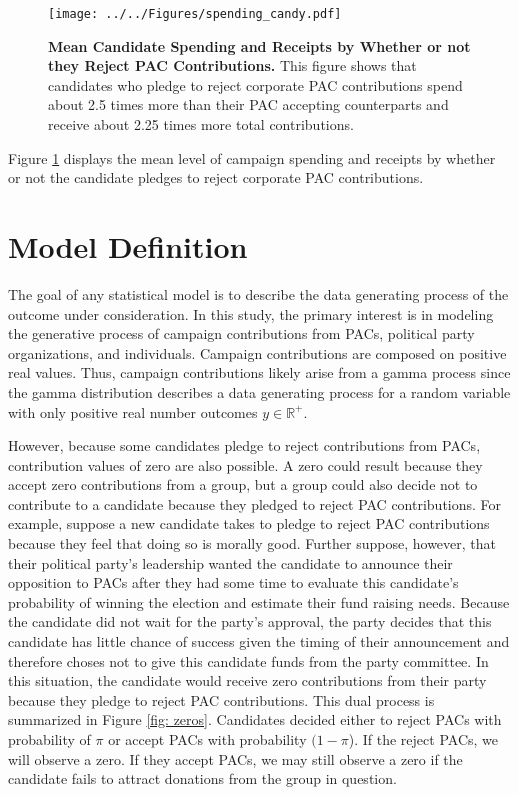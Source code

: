 \documentclass[12pt]{article}
\begin{document}
\begin{figure}[ht]
	\centering
	\texttt{[image: ../../Figures/spending\_candy.pdf]}
	\caption{\textbf{Mean Candidate Spending and Receipts by Whether or not they Reject PAC Contributions.} This figure shows that candidates who pledge to reject corporate PAC contributions spend about 2.5 times more than their PAC accepting counterparts and receive about 2.25 times more total contributions.}
	\label{fig: spending}
\end{figure}

Figure \ref{fig: spending} displays the mean level of campaign spending and receipts by whether or not the candidate pledges to reject corporate PAC contributions.


\section{Model Definition}

The goal of any statistical model is to describe the data generating process of the outcome under consideration. In this study, the primary interest is in modeling the generative process of campaign contributions from PACs, political party organizations, and individuals. Campaign contributions are composed on positive real values. Thus, campaign contributions likely arise from a gamma process since the gamma distribution describes a data generating process for a random variable with only positive real number outcomes $y \in  \mathbb{R}^+$. 

However, because some candidates pledge to reject contributions from PACs, contribution values of zero are also possible. A zero could result because they accept zero contributions from a group, but a group could also decide not to contribute to a candidate because they pledged to reject PAC contributions. For example, suppose a new candidate takes to pledge to reject PAC contributions because they feel that doing so is morally good. Further suppose, however, that their political party's leadership wanted the candidate to announce their opposition to PACs after they had some time to evaluate this candidate's probability of winning the election and estimate their fund raising needs. Because the candidate did not wait for the party's approval, the party decides that this candidate has little chance of success given the timing of their announcement and therefore choses not to give this candidate funds from the party committee. In this situation, the candidate would receive zero contributions from their party because they pledge to reject PAC contributions. This dual process is summarized in Figure \ref{fig: zeros}. Candidates decided either to reject PACs with probability of $\pi$ or accept PACs with probability $(1 - \pi$). If the reject PACs, we will observe a zero. If they accept PACs, we may still observe a zero if the candidate fails to attract donations from the group in question. 
\end{document}
